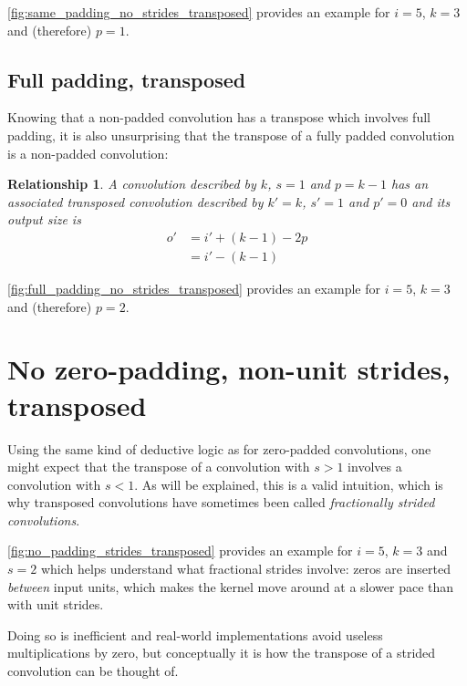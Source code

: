 \documentclass{report}
\newtheorem{relationship}{Relationship}
\begin{document}
\autoref{fig:same_padding_no_strides_transposed} provides an example for $i =
5$, $k = 3$ and (therefore) $p = 1$.

\subsection{Full padding, transposed}

Knowing that a non-padded convolution has a transpose which involves full
padding, it is also unsurprising that the transpose of a fully padded
convolution is a non-padded convolution:

\begin{relationship}\label{rel:full_padding_no_strides_transposed}
A convolution described by $k$, $s = 1$ and $p = k - 1$ has an associated
transposed convolution described by $k' = k$, $s' = 1$ and $p' = 0$ and its
output size is
\begin{equation*}
\begin{split}
    o' &= i' + (k - 1) - 2p \\
       &= i' - (k - 1)
\end{split}
\end{equation*}
\end{relationship}

\autoref{fig:full_padding_no_strides_transposed} provides an example for $i =
5$, $k = 3$ and (therefore) $p = 2$.

\section{No zero-padding, non-unit strides, transposed}

Using the same kind of deductive logic as for zero-padded convolutions, one
might expect that the transpose of a convolution with $s > 1$ involves a
convolution with $s < 1$. As will be explained, this is a valid intuition, which
is why transposed convolutions have sometimes been called {\em fractionally
strided convolutions}.

\autoref{fig:no_padding_strides_transposed} provides an example for $i = 5$, $k
= 3$ and $s = 2$ which helps understand what fractional strides involve: zeros
are inserted {\em between} input units, which makes the kernel move around at a
slower pace than with unit strides.

Doing so is inefficient and real-world implementations avoid useless
multiplications by zero, but conceptually it is how the transpose of a strided
convolution can be thought of.
\end{document}

